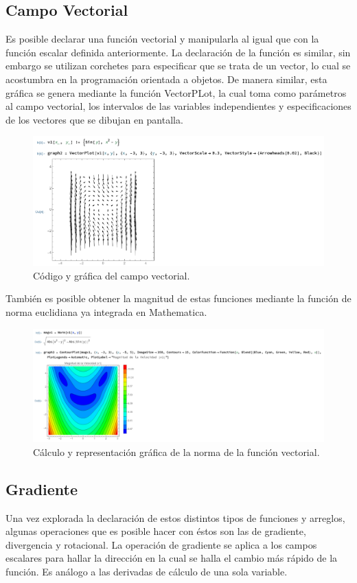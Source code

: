 \documentclass[12pt, letterpaper]{article}
\begin{document}
\subsection*{Campo Vectorial}
Es posible declarar una función vectorial y manipularla al igual que con la función escalar definida anteriormente. La declaración de la función es similar, sin embargo se utilizan corchetes para especificar que se trata de un vector, lo cual se acostumbra en la programación orientada a objetos. De manera similar, esta gráfica se genera mediante la función VectorPLot, la cual toma como parámetros al campo vectorial, los intervalos de las variables independientes y especificaciones de los vectores que se dibujan en pantalla. 

\begin{figure}[H]
	\centering
	\includegraphics[width=\textwidth]{2.png}
	\caption{Código y gráfica del campo vectorial.}
\end{figure}

También es posible obtener la magnitud de estas funciones mediante la función de norma euclidiana ya integrada en Mathematica.

\begin{figure}[H]
	\centering
	\includegraphics[width=\textwidth]{3.png}
	\caption{Cálculo y representación gráfica de la norma de la función vectorial.}
\end{figure}
\subsection*{Gradiente}
Una vez explorada la declaración de estos distintos tipos de funciones y arreglos, algunas operaciones que es posible hacer con éstos son las de gradiente, divergencia y rotacional. La operación de gradiente se aplica a los campos escalares para hallar la dirección en la cual se halla el cambio más rápido de la función. Es análogo a las derivadas de cálculo de una sola variable.
\end{document}
